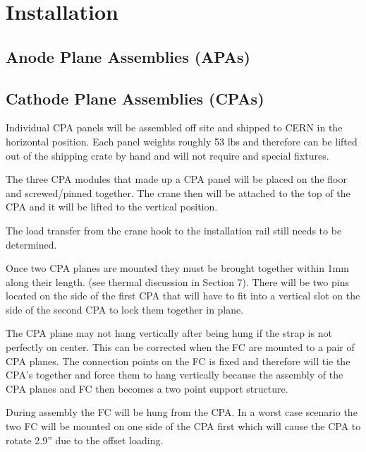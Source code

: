 
\section{Installation}


\subsection{Anode Plane Assemblies (APAs)}



\subsection{Cathode Plane Assemblies (CPAs)}


Individual CPA panels will be assembled off site and shipped to CERN in the horizontal position.  Each panel weights roughly 53 lbs and therefore can be lifted out of the shipping crate by hand and will not require and special fixtures.

The three CPA modules that made up a CPA panel will be placed on the floor and screwed/pinned together.   The crane then will be attached to the top of the CPA and it will be lifted to the vertical position.  

The load transfer from the crane hook to the installation rail still needs to be determined.  

Once two CPA planes are mounted they must be brought together within 1mm along their length.  (see thermal discussion in Section 7).  There will be two pins located on the side of the first CPA that will have to fit into a vertical slot on the side of the second CPA to lock them together in plane.  

The CPA plane may not hang vertically after being hung if the strap is not perfectly on center.  This can be corrected when the FC are mounted to a pair of CPA planes.  The connection points on the FC is fixed and therefore will tie the CPA’s together and force them to hang vertically because the assembly of the CPA planes and FC then becomes a two point support structure.  

During assembly the FC will be hung from the CPA.  In a worst case scenario the two FC will be mounted on one side of the CPA first which will cause the CPA to rotate 2.9'' due to the offset loading.  



